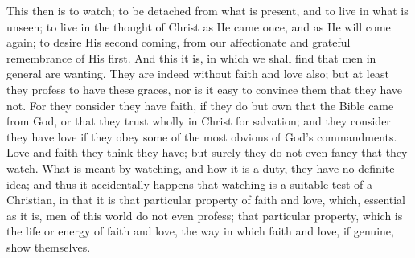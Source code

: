 This then is to watch; to be detached from what is present, and to
live in what is unseen; to live in the thought of Christ as He came
once, and as He will come again; to desire His second coming, from our
affectionate and grateful remembrance of His first. And this it is, in
which we shall find that men in general are wanting. They are indeed
without faith and love also; but at least they profess to have these
graces, nor is it easy to convince them that they have not. For they
consider they have faith, if they do but own that the Bible came from
God, or that they trust wholly in Christ for salvation; and they
consider they have love if they obey some of the most obvious of God's
commandments. Love and faith they think they have; but surely they do
not even fancy that they watch. What is meant by watching, and how it
is a duty, they have no definite idea; and thus it accidentally
happens that watching is a suitable test of a Christian, in that it is
that particular property of faith and love, which, essential as it is,
men of this world do not even profess; that particular property, which
is the life or energy of faith and love, the way in which faith and
love, if genuine, show themselves.


